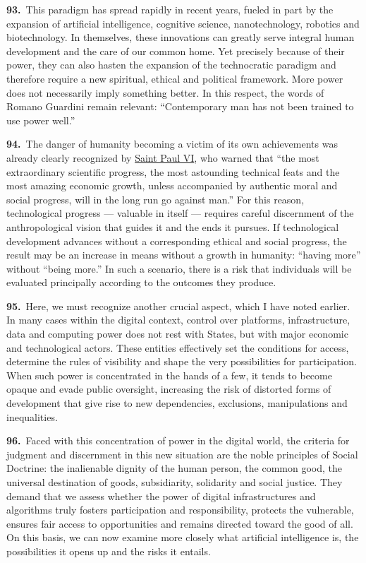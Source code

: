 \documentclass{article}
\begin{document}
\textbf{93.}\ This paradigm has spread rapidly in recent years, fueled in part by the expansion of artificial intelligence, cognitive science, nanotechnology, robotics and biotechnology. In themselves, these innovations can greatly serve integral human development and the care of our common home. Yet precisely because of their power, they can also hasten the expansion of the technocratic paradigm and therefore require a new spiritual, ethical and political framework. More power does not necessarily imply something better. In this respect, the words of Romano Guardini remain relevant: ``Contemporary man has not been trained to use power well.''\cite{n120}

\textbf{94.}\ The danger of humanity becoming a victim of its own achievements was already clearly recognized by \href{https://www.vatican.va/content/paul-vi/en.html}{Saint Paul VI}, who warned that ``the most extraordinary scientific progress, the most astounding technical feats and the most amazing economic growth, unless accompanied by authentic moral and social progress, will in the long run go against man.''\cite{n121} For this reason, technological progress --- valuable in itself --- requires careful discernment of the anthropological vision that guides it and the ends it pursues. If technological development advances without a corresponding ethical and social progress, the result may be an increase in means without a growth in humanity: ``having more'' without ``being more.'' In such a scenario, there is a risk that individuals will be evaluated principally according to the outcomes they produce.\cite{n122}

\textbf{95.}\ Here, we must recognize another crucial aspect, which I have noted earlier. In many cases within the digital context, control over platforms, infrastructure, data and computing power does not rest with States, but with major economic and technological actors. These entities effectively set the conditions for access, determine the rules of visibility and shape the very possibilities for participation. When such power is concentrated in the hands of a few, it tends to become opaque and evade public oversight, increasing the risk of distorted forms of development that give rise to new dependencies, exclusions, manipulations and inequalities.

\textbf{96.}\ Faced with this concentration of power in the digital world, the criteria for judgment and discernment in this new situation are the noble principles of Social Doctrine: the inalienable dignity of the human person, the common good, the universal destination of goods, subsidiarity, solidarity and social justice. They demand that we assess whether the power of digital infrastructures and algorithms truly fosters participation and responsibility, protects the vulnerable, ensures fair access to opportunities and remains directed toward the good of all. On this basis, we can now examine more closely what artificial intelligence is, the possibilities it opens up and the risks it entails.
\end{document}
